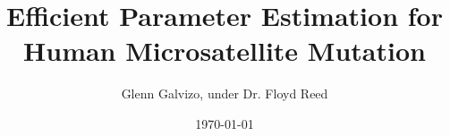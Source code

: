 \documentclass[11pt]{article}
\title{\huge Efficient Parameter Estimation for Human Microsatellite Mutation}
\author{Glenn Galvizo, under Dr. Floyd Reed}
\date{\today}
\numberwithin{equation}{section}
\begin{document}
    \maketitle
    
    
    \newpage

    \tableofcontents
    \newpage

    
    
    
    
    
    
    
    

    \nocite{*}
    
	
\end{document}
